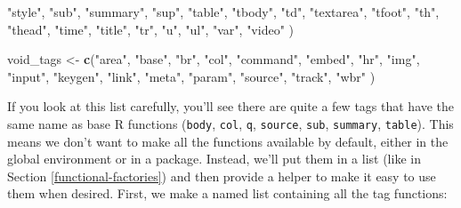 \documentclass[]{book}
\newenvironment{Shaded}{\begin{snugshade}}{\end{snugshade}}
\newcommand{\KeywordTok}[1]{\textcolor[rgb]{0.27,0.27,0.27}{\textbf{#1}}}
\newcommand{\NormalTok}[1]{#1}
\newcommand{\OperatorTok}[1]{\textcolor[rgb]{0.43,0.43,0.43}{\textbf{#1}}}
\newcommand{\StringTok}[1]{\textcolor[rgb]{0.5,0.5,0.5}{#1}}
\begin{document}
\begin{Shaded}
\begin{Highlighting}[]
  \StringTok{"style"}\NormalTok{, }\StringTok{"sub"}\NormalTok{, }\StringTok{"summary"}\NormalTok{, }\StringTok{"sup"}\NormalTok{, }\StringTok{"table"}\NormalTok{, }\StringTok{"tbody"}\NormalTok{, }\StringTok{"td"}\NormalTok{,}
  \StringTok{"textarea"}\NormalTok{, }\StringTok{"tfoot"}\NormalTok{, }\StringTok{"th"}\NormalTok{, }\StringTok{"thead"}\NormalTok{, }\StringTok{"time"}\NormalTok{, }\StringTok{"title"}\NormalTok{, }\StringTok{"tr"}\NormalTok{,}
  \StringTok{"u"}\NormalTok{, }\StringTok{"ul"}\NormalTok{, }\StringTok{"var"}\NormalTok{, }\StringTok{"video"}
\NormalTok{)}

\NormalTok{void_tags <-}\StringTok{ }\KeywordTok{c}\NormalTok{(}\StringTok{"area"}\NormalTok{, }\StringTok{"base"}\NormalTok{, }\StringTok{"br"}\NormalTok{, }\StringTok{"col"}\NormalTok{, }\StringTok{"command"}\NormalTok{, }\StringTok{"embed"}\NormalTok{,}
  \StringTok{"hr"}\NormalTok{, }\StringTok{"img"}\NormalTok{, }\StringTok{"input"}\NormalTok{, }\StringTok{"keygen"}\NormalTok{, }\StringTok{"link"}\NormalTok{, }\StringTok{"meta"}\NormalTok{, }\StringTok{"param"}\NormalTok{,}
  \StringTok{"source"}\NormalTok{, }\StringTok{"track"}\NormalTok{, }\StringTok{"wbr"}
\NormalTok{)}
\end{Highlighting}
\end{Shaded}

If you look at this list carefully, you'll see there are quite a few tags that have the same name as base R functions (\texttt{body}, \texttt{col}, \texttt{q}, \texttt{source}, \texttt{sub}, \texttt{summary}, \texttt{table}). This means we don't want to make all the functions available by default, either in the global environment or in a package. Instead, we'll put them in a list (like in Section \ref{functional-factories}) and then provide a helper to make it easy to use them when desired. First, we make a named list containing all the tag functions:

\begin{Shaded}
\end{Shaded}
\end{document}
